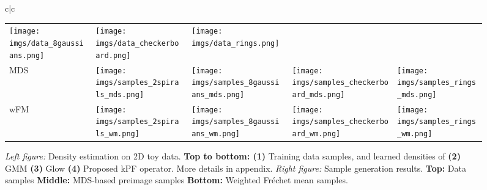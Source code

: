 \begin{figure}[t]
\begin{tabular}{c|c}
\begin{tabular}{m{1cm} m{1.2cm} m{1.2cm} m{1.2cm} m{1.2cm}}
            \texttt{[image: imgs/data\_8gaussians.png]}&
            \texttt{[image: imgs/data\_checkerboard.png]}&
            \texttt{[image: imgs/data\_rings.png]}\\
            MDS &
            \texttt{[image: imgs/samples\_2spirals\_mds.png]}&
            \texttt{[image: imgs/samples\_8gaussians\_mds.png]}&
            \texttt{[image: imgs/samples\_checkerboard\_mds.png]}&
            \texttt{[image: imgs/samples\_rings\_mds.png]}\\
            wFM &
            \texttt{[image: imgs/samples\_2spirals\_wm.png]}&
            \texttt{[image: imgs/samples\_8gaussians\_wm.png]}&
            \texttt{[image: imgs/samples\_checkerboard\_wm.png]}&
            \texttt{[image: imgs/samples\_rings\_wm.png]}\\
         \end{tabular}
    \end{tabular}
    \vspace{-8pt}
    \caption{\textit{Left figure:} Density estimation on 2D toy data. \textbf{Top to bottom: (1)} Training data samples, and learned densities of \textbf{(2)} GMM \textbf{(3)} Glow \textbf{(4)} Proposed kPF operator. More details in appendix. \textit{Right figure:} Sample generation results. \textbf{Top:} Data samples \textbf{Middle:} MDS-based preimage samples \textbf{Bottom:} Weighted Fr\'{e}chet mean samples.}
    \label{fig:density}
\end{figure}

 
